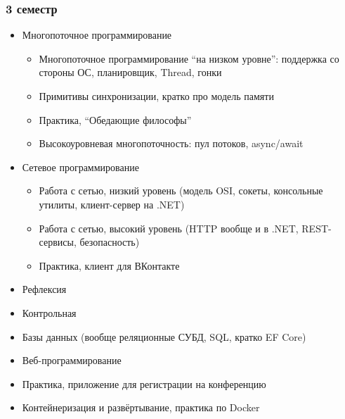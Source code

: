 \documentclass[xetex,mathserif,serif]{beamer}
\begin{document}
    \begin{frame}
        \frametitle{3 семестр}
        \begin{scriptsize}
            \begin{itemize}
                \item Многопоточное программирование
                \begin{itemize}
                    \item \scriptsize{Многопоточное программирование ``на низком уровне'': поддержка со стороны ОС, планировщик, Thread, гонки}
                    \item Примитивы синхронизации, кратко про модель памяти
                    \item Практика, ``Обедающие философы''
                    \item Высокоуровневая многопоточность: пул потоков, async/await
                \end{itemize}
                \item Сетевое программирование
                \begin{itemize}
                    \item \scriptsize{Работа с сетью, низкий уровень (модель OSI, сокеты, консольные утилиты, клиент-сервер на .NET)}
                    \item Работа с сетью, высокий уровень (HTTP вообще и в .NET, REST-сервисы, безопасность)
                    \item Практика, клиент для ВКонтакте
                \end{itemize}
                \item Рефлексия
                \item Контрольная
                \item Базы данных (вообще реляционные СУБД, SQL, кратко EF Core)
                \item Веб-программирование
                \item Практика, приложение для регистрации на конференцию
                \item Контейнеризация и развёртывание, практика по Docker
            \end{itemize}
        \end{scriptsize}
    \end{frame}
\end{document}
